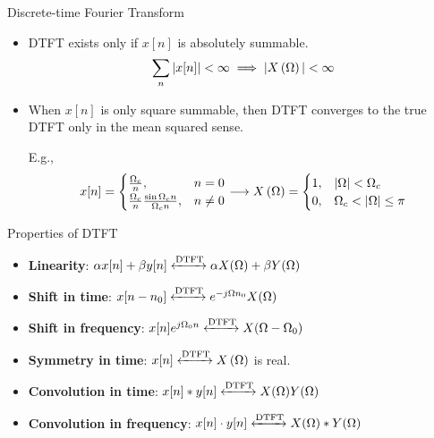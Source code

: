 \documentclass[aspectratio=169]{beamer}
\let\olditem\item
\renewcommand{\item}{\setlength{\itemsep}{\fill}\olditem}
\def\lp{\ensuremath\left(}
\def\rp{\ensuremath\right)}
\begin{document}
\begin{frame}[t]{Discrete-time Fourier Transform}
\begin{itemize}
  \item DTFT exists only if $x[n]$ is absolutely summable.
  \[ \sum_n \vert x[n] \vert < \infty  \implies \vert X\lp \Omega \rp \vert < \infty \]

  \item When $x[n]$ is only square summable, then DTFT converges to the true DTFT only in the mean squared sense.

  E.g., 
  \[ x[n] = \begin{cases} \frac{\Omega_c}{n}, & n = 0 \\ \frac{\Omega_c}{n} \frac{\sin \Omega_c n}{\Omega_c n}, & n \neq 0 \end{cases} \longrightarrow X\lp \Omega \rp  = \begin{cases} 1, & \vert \Omega \vert < \Omega_c  \\  0, & \Omega_c < \vert \Omega \vert \leq \pi \end{cases} \]
\end{itemize}  
\end{frame}


\begin{frame}[t]{Properties of DTFT}
\begin{itemize}
  \item \textbf{Linearity}: $\alpha x[n] + \beta y[n] \xleftrightarrow{\text{DTFT}} \alpha X(\Omega) + \beta Y(\Omega)$
  \item \textbf{Shift in time}: $ x[n-n_0] \xleftrightarrow{\text{DTFT}} e^{-j\Omega n_0}X(\Omega)$
  \item \textbf{Shift in frequency}: $ x[n]e^{j\Omega_0 n} \xleftrightarrow{\text{DTFT}} X(\Omega - \Omega_0) $
  \item \textbf{Symmetry in time}: $ x[n] \xleftrightarrow{\text{DTFT}} X\left(\Omega\right)$ is real.
  \item \textbf{Convolution in time}: $x[n] * y[n] \xleftrightarrow{\text{DTFT}} X(\Omega)Y(\Omega)$
  \item \textbf{Convolution in frequency}: $x[n] \cdot y[n] \xleftrightarrow{\text{DTFT}} X(\Omega) * Y(\Omega)$
\end{itemize}
\end{frame}
\end{document}
